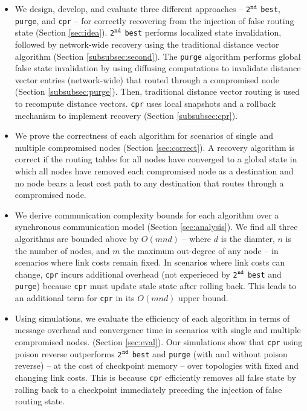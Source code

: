 \documentclass[10pt,conference]{IEEEtran}
\newcommand{\second}{{{\tt 2}$^{{\tt nd}}$ {\tt best} }}
\newcommand{\seconds}{{{\tt 2}$^{{\tt nd}}$ {\tt best}}}
\newcommand{\purge}{{{\tt purge} }}
\newcommand{\purges}{{{\tt purge}}}
\newcommand{\cpr}{{\tt cpr} }
\begin{document}
\begin{itemize}

\item We design, develop, and evaluate three different approaches -- \seconds, \purges, and \cpr -- for correctly recovering from the injection of false routing state (Section \ref{sec:idea}). 
\second performs localized state invalidation, followed by network-wide recovery using the traditional distance vector algorithm (Section \ref{subsubsec:second}).
The \purge algorithm performs global false state invalidation by using diffusing computations to invalidate distance vector 
entries (network-wide) that routed through a compromised node (Section \ref{subsubsec:purge}). Then, traditional distance vector routing is used to recompute distance vectors.
\cpr uses local snapshots and a rollback mechanism to implement recovery (Section \ref{subsubsec:cpr}). 

\item We prove the correctness of each algorithm for scenarios of single and multiple compromised nodes (Section \ref{sec:correct}). 
A recovery algorithm is correct if the routing tables for all nodes have converged to a global state in which all nodes 
have removed each compromised node as a destination and no node bears a least cost path to any destination that routes through a compromised node.

\item We derive communication complexity bounds for each algorithm over a synchronous communication model (Section \ref{sec:analysis}).  
We find all three algorithms are bounded above by $O(mnd)$ -- where $d$ is the diamter, $n$ is the number of nodes, and $m$ the maximum out-degree of any node -- in scenarios where 
link costs remain fixed.  In scenarios where link costs can change, \cpr incurs additional overhead (not experieced by \second and \purges) because \cpr must update stale
state after rolling back.  This leads to an additional term for \cpr in its $O(mnd)$ upper bound. %

\item Using simulations, we evaluate the efficiency of each algorithm in terms of message overhead and convergence time in scenarios with single and 
multiple compromised nodes. (Section \ref{sec:eval}).
Our simulations show that \cpr using poison reverse outperforms \second and \purge (with and without poison reverse) -- at the cost of checkpoint memory --
over topologies with fixed and changing link costs. This is because \cpr efficiently removes all false state by rolling back to a checkpoint
immediately preceding the injection of false routing state. 


\end{itemize}
\end{document}

